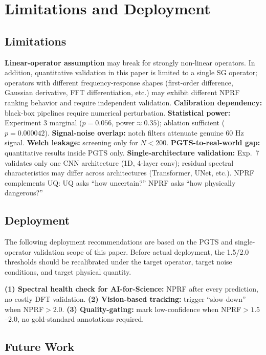 \documentclass[9pt,twocolumn]{article}
\theoremstyle{remark}
\theoremstyle{definition}
\begin{document}
\section{Limitations and Deployment}

\subsection{Limitations}

\textbf{Linear-operator assumption} may break for strongly non-linear operators. In addition, quantitative validation in this paper is limited to a single SG operator; operators with different frequency-response shapes (first-order difference, Gaussian derivative, FFT differentiation, etc.) may exhibit different NPRF ranking behavior and require independent validation. \textbf{Calibration dependency:} black-box pipelines require numerical perturbation. \textbf{Statistical power:} Experiment 3 marginal ($p=0.056$, power$\approx0.35$); ablation sufficient ($p=0.000042$). \textbf{Signal-noise overlap:} notch filters attenuate genuine 60 Hz signal. \textbf{Welch leakage:} screening only for $N<200$. \textbf{PGTS-to-real-world gap:} quantitative results inside PGTS only. \textbf{Single-architecture validation:} Exp.~7 validates only one CNN architecture (1D, 4-layer conv); residual spectral characteristics may differ across architectures (Transformer, UNet, etc.). NPRF complements UQ: UQ asks ``how uncertain?'' NPRF asks ``how physically dangerous?''

\subsection{Deployment}

The following deployment recommendations are based on the PGTS and single-operator validation scope of this paper. Before actual deployment, the 1.5/2.0 thresholds should be recalibrated under the target operator, target noise conditions, and target physical quantity.

\textbf{(1) Spectral health check for AI-for-Science:} NPRF after every prediction, no costly DFT validation. \textbf{(2) Vision-based tracking:} trigger ``slow-down'' when NPRF$>2.0$. \textbf{(3) Quality-gating:} mark low-confidence when NPRF$>1.5$--$2.0$, no gold-standard annotations required\cite{ardila2019}.

\subsection{Future Work}
\end{document}
